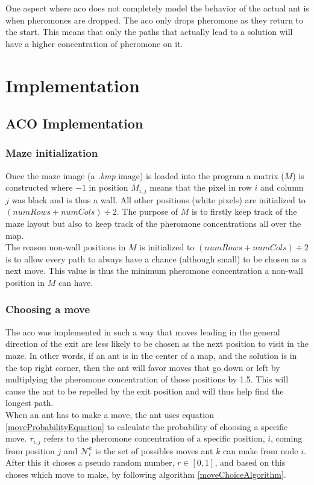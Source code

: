 \documentclass[hidelinks,english,conference]{IEEEtran}
\begin{document}
    One aspect where \gls{aco} does not completely model the behavior of the actual ant is when pheromones are dropped. The \gls{aco} only drops pheromone as they return to the start. This means that only the paths that actually lead to a solution will have a higher concentration of pheromone on it.
    
\section{Implementation}
	\subsection{ACO Implementation}
	\subsubsection{Maze initialization}
	Once the maze image (a \textit{.bmp} image) is loaded into the program a matrix ($M$) is constructed where $-1$ in position $M_{i,j}$ means that the pixel in row $i$ and column $j$ was black and is thus a wall. All other positions (white pixels) are initialized to $(numRows + numCols) \div 2$. The purpose of $M$ is to firstly keep track of the maze layout but also to keep track of the pheromone concentrations all over the map.\\
    
    The reason non-wall positions in $M$ is initialized to $(numRows + numCols) \div 2$ is to allow every path to always have a chance (although small) to be chosen as a next move. This value is thus the minimum pheromone concentration a non-wall position in $M$ can have.\\
    
    \subsubsection{Choosing a move}
	The \gls{aco} was implemented in such a way that moves leading in the general direction of the exit are less likely to be chosen as the next position to visit in the maze. In other words, if an ant is in the center of a map, and the solution is in the top right corner, then the ant will favor moves that go down or left by multiplying the pheromone concentration of those positions by 1.5. This will cause the ant to be repelled by the exit position and will thus help find the longest path.\\
    
    When an ant has to make a move, the ant uses equation \ref{moveProbabilityEquation} to calculate the probability of choosing a specific move. $\tau_{i,j}$ refers to the pheromone concentration of a specific position, $i$, coming from position $j$ and $ \mathcal{N}_{i}^{k}$ is the set of possibles moves ant $k$ can make from node $i$. After this it choses a pseudo random number, $r\in\left[0,1\right]$, and based on this choses which move to make, by following algorithm \ref{moveChoiceAlgorithm}.
  
\end{document}
